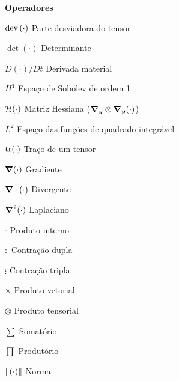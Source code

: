 \begin{simbolos}
  \item[\textbf{Operadores}]
  \item[$\mathop{\mathrm{dev}}\nolimits{(}\cdot)$] Parte desviadora do tensor
  \item[$\det{(\cdot)}$] Determinante
  \item[$D(\cdot)/Dt$] Derivada material
  \item[$H^1$] Espaço de Sobolev de ordem 1
  \item[$\mathcal{H}(\cdot)$] Matriz Hessiana ($\boldsymbol{\nabla_y}\otimes\boldsymbol{\nabla_y}(\cdot)$)
  \item[$L^2$] Espaço das funções de quadrado integrável
  \item[$\mathop{\mathrm{tr}}\nolimits(\cdot)$] Traço de um tensor
  \item[$\boldsymbol{\nabla}(\cdot)$] Gradiente
  \item[$\boldsymbol{\nabla}\cdot(\cdot)$] Divergente
  \item[$\boldsymbol{\nabla}^2(\cdot)$] Laplaciano
  \item[$\cdot$] Produto interno
  \item[$:$] Contração dupla
  \item[$\vdots$] Contração tripla
  \item[$\times$] Produto vetorial
  \item[$\otimes$] Produto tensorial
  \item[$\sum$] Somatório
  \item[$\prod$] Produtório
  \item[$\left\lVert{(\cdot)}\right\lVert$] Norma


\end{simbolos}
